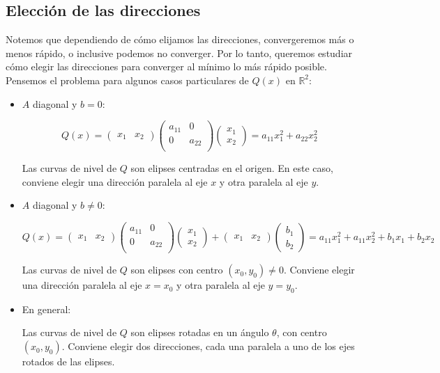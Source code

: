 \subsection{Elección de las direcciones}

Notemos que dependiendo de cómo elijamos las direcciones, convergeremos más o menos rápido, o inclusive podemos no converger. Por lo tanto, queremos estudiar cómo elegir las direcciones para converger al mínimo lo más rápido posible. Pensemos el problema para algunos casos particulares de $Q(x)$ en $\mathbb{R}^2$:

\begin{itemize}
\item $A$ diagonal y $b = 0$:

\[Q(x) = \begin{pmatrix}x_1 & x_2\end{pmatrix}
\begin{pmatrix}
a_{11} & 0\\
0 & a_{22}\\
\end{pmatrix}
\begin{pmatrix}
x_1 \\ x_2
\end{pmatrix} = a_{11}x_1^2 + a_{22}x_2^2
\]


Las curvas de nivel de $Q$ son elipses centradas en el origen. En este caso, conviene elegir una dirección paralela al eje $x$ y otra paralela al eje $y$.

\item $A$ diagonal y $b \neq 0$:

\[Q(x) = \begin{pmatrix}x_1 & x_2\end{pmatrix}
\begin{pmatrix}
a_{11} & 0\\
0 & a_{22}\\
\end{pmatrix}
\begin{pmatrix}
x_1 \\ x_2
\end{pmatrix} + \begin{pmatrix}x_1 & x_2\end{pmatrix}
\begin{pmatrix}
b_1 \\ b_2
\end{pmatrix}
 = a_{11}x_1^2 + a_{11}x_2^2 + b_1 x_1 + b_2 x_2
\]

Las curvas de nivel de $Q$ son elipses con centro $(x_0, y_0) \neq 0$. Conviene elegir una dirección paralela al eje $x = x_0$ y otra paralela al eje $y = y_0$.

\item En general:

Las curvas de nivel de $Q$ son elipses rotadas en un ángulo $\theta$, con centro $(x_0, y_0)$. Conviene elegir dos direcciones, cada una paralela a uno de los ejes rotados de las elipses.

\end{itemize}

